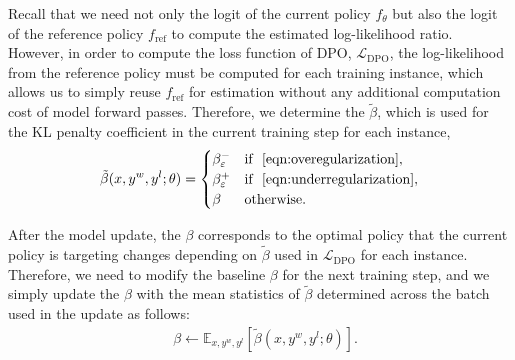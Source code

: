 Recall that we need not only the logit of the current policy $f_\theta$ but also the logit of the reference policy $f_\text{ref}$ to compute the estimated log-likelihood ratio. However, in order to compute the loss function of DPO, $\mathcal{L}_\text{DPO}$, the log-likelihood from the reference policy must be computed for each training instance, which allows us to simply reuse $f_\text{ref}$ for estimation without any additional computation cost of model forward passes. Therefore, we determine the $\tilde{\beta}$, which is used for the KL penalty coefficient in the current training step for each instance,
\begin{equation}\label{eqn:beta_selection}
\begin{split}
\tilde{\beta}(x, y^w, y^l; \theta) &= 
  \begin{cases}
    \beta^-_{\varepsilon} & \text{if } ~\eqref{eqn:overegularization},\\
    \beta^+_{\varepsilon} & \text{if } ~\eqref{eqn:underregularization},\\
    \beta & \text{otherwise}.
  \end{cases}\\
\end{split}
\end{equation}

After the model update, the $\beta$ corresponds to the optimal policy that the current policy is targeting changes depending on $\tilde{\beta}$ used in $\mathcal{L}_\text{DPO}$ for each instance. Therefore, we need to modify the baseline $\beta$ for the next training step, and we simply update the $\beta$ with the mean statistics of $\tilde{\beta}$ determined across the batch used in the update as follows:
\begin{equation}\label{eqn:updates}
\begin{split}
& \beta \leftarrow \mathbb{E}_{x, y^w, y^l}[\tilde{\beta}(x, y^w, y^l; \theta)]. \\
\end{split}
\end{equation}

